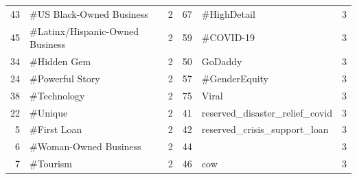 \begin{longtable}{|r|l|l|r|l|l|}
	43                                & \#US Black-Owned Business          & 2                                                       & 67                               & \#HighDetail                        & 3                                                      \\
	45                                & \#Latinx/Hispanic-Owned Business   & 2                                                       & 59                               & \#COVID-19                          & 3                                                      \\
	34                                & \#Hidden Gem                       & 2                                                       & 50                               & GoDaddy                             & 3                                                      \\
	24                                & \#Powerful Story                   & 2                                                       & 57                               & \#GenderEquity                      & 3                                                      \\
	38                                & \#Technology                       & 2                                                       & 75                               & Viral                               & 3                                                      \\
	22                                & \#Unique                           & 2                                                       & 41                               & reserved\_disaster\_relief\_covid   & 3                                                      \\
	5                                 & \#First Loan                       & 2                                                       & 42                               & reserved\_crisis\_support\_loan     & 3                                                      \\
	6                                 & \#Woman-Owned Business             & 2                                                       & 44                               &                                     & 3                                                      \\
	7                                 & \#Tourism                          & 2                                                       & 46                               & cow                                 & 3                                                      \\

\end{longtable}
